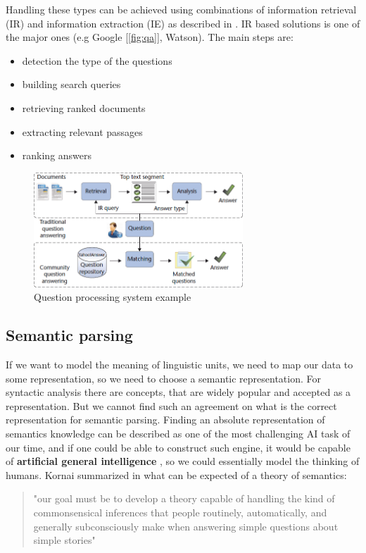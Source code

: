 Handling these types can be achieved using combinations of information retrieval (IR) and information extraction (IE) as described in \cite{Ralph:2017}.
IR based solutions is one of the major ones (e.g Google [\ref{fig:qa}], Watson). The main steps are:
\begin{itemize}
	\item detection the type of the questions
	\item building search queries
	\item retrieving ranked documents
	\item extracting relevant passages
	\item ranking answers
\end{itemize}

\begin{figure}[h]
	\centering
	\includegraphics[width=0.7\textwidth]{figures/ie}
	\caption{Question processing system example \cite{IEsystem}}
	\label{fig:ie}
\end{figure}

\subsection{Semantic parsing}
If we want to model the meaning of linguistic units, we need to map our data to some representation, so we need to choose a semantic representation. For syntactic analysis there are concepts, that are widely popular and accepted as a representation. But we cannot find such an agreement on what is the correct representation for semantic parsing.
Finding an absolute representation of semantics knowledge can be described as one of the most challenging AI task of our time, and if one could be able to construct such engine, it would be capable of \textbf{artificial general intelligence} \cite{Kornai:2018}, so we could essentially model the thinking of humans. Kornai summarized in \cite{Kornai:2018} what can be expected of a theory of semantics:
\begin{quotation}
	"our goal must be to develop a theory capable of handling the kind of commonsensical inferences that people routinely, automatically, and generally subconsciously make when answering simple questions about simple stories"
\end{quotation}
 
